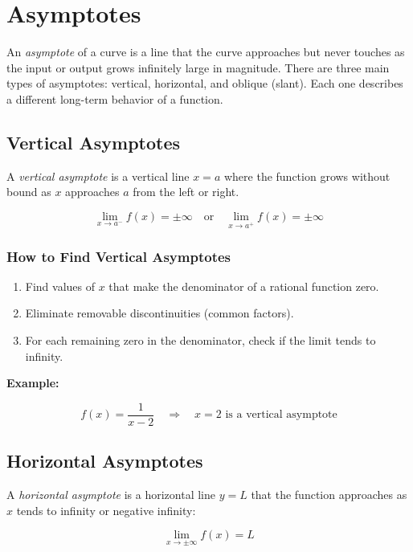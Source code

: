 \newpage
\section{Asymptotes}

An \emph{asymptote} of a curve is a line that the curve approaches but never touches as the input or output grows infinitely large in magnitude. There are three main types of asymptotes: vertical, horizontal, and oblique (slant). Each one describes a different long-term behavior of a function.

\subsection{Vertical Asymptotes}

A \emph{vertical asymptote} is a vertical line \(x = a\) where the function grows without bound as \(x\) approaches \(a\) from the left or right.

\[
\lim_{x \to a^-} f(x) = \pm \infty \quad \text{or} \quad \lim_{x \to a^+} f(x) = \pm \infty
\]

\subsubsection{How to Find Vertical Asymptotes}

\begin{enumerate}
    \item Find values of \(x\) that make the denominator of a rational function zero.
    \item Eliminate removable discontinuities (common factors).
    \item For each remaining zero in the denominator, check if the limit tends to infinity.
\end{enumerate}

\textbf{Example:}
\vspace{\baselineskip}

\[
f(x) = \frac{1}{x - 2} \quad \Rightarrow \quad x = 2 \text{ is a vertical asymptote}
\]

\subsection{Horizontal Asymptotes}

A \emph{horizontal asymptote} is a horizontal line \(y = L\) that the function approaches as \(x\) tends to infinity or negative infinity:

\[
\lim_{x \to \pm\infty} f(x) = L
\]

